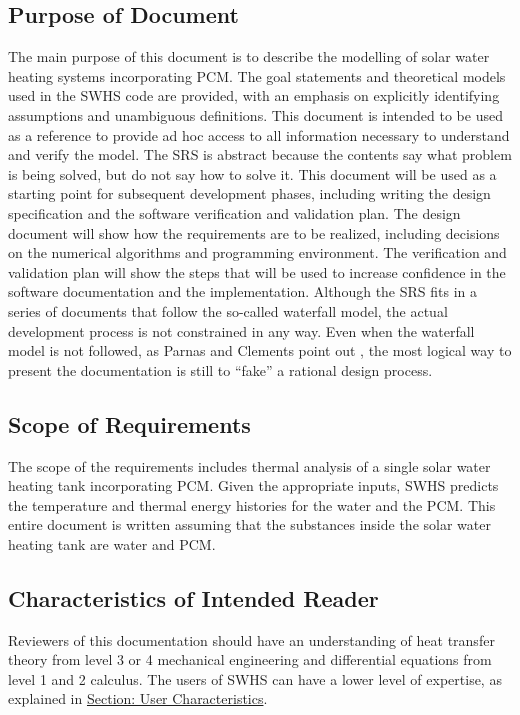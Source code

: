 \documentclass[12pt]{article}
\begin{document}
\subsection{Purpose of Document}
\label{Sec:DocPurpose}
The main purpose of this document is to describe the modelling of solar water heating systems incorporating PCM. The goal statements and theoretical models used in the SWHS code are provided, with an emphasis on explicitly identifying assumptions and unambiguous definitions. This document is intended to be used as a reference to provide ad hoc access to all information necessary to understand and verify the model. The SRS is abstract because the contents say what problem is being solved, but do not say how to solve it.
This document will be used as a starting point for subsequent development phases, including writing the design specification and the software verification and validation plan. The design document will show how the requirements are to be realized, including decisions on the numerical algorithms and programming environment. The verification and validation plan will show the steps that will be used to increase confidence in the software documentation and the implementation. Although the SRS fits in a series of documents that follow the so-called waterfall model, the actual development process is not constrained in any way. Even when the waterfall model is not followed, as Parnas and Clements point out \cite{parnasClements1986}, the most logical way to present the documentation is still to ``fake'' a rational design process.
\subsection{Scope of Requirements}
\label{Sec:ReqsScope}
The scope of the requirements includes thermal analysis of a single solar water heating tank incorporating PCM. Given the appropriate inputs, SWHS predicts the temperature and thermal energy histories for the water and the PCM. This entire document is written assuming that the substances inside the solar water heating tank are water and PCM.
\subsection{Characteristics of Intended Reader}
\label{Sec:ReaderChars}
Reviewers of this documentation should have an understanding of heat transfer theory from level 3 or 4 mechanical engineering and differential equations from level 1 and 2 calculus. The users of SWHS can have a lower level of expertise, as explained in \hyperref[Sec:UserChars]{Section: User Characteristics}.
\end{document}
